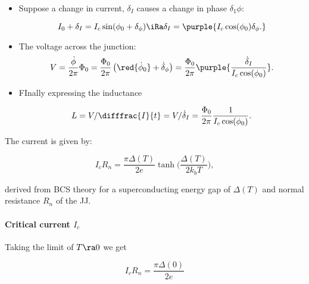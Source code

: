   \begin{itemize}
  	\item Suppose a change in current, $ \delta_I $ causes a change in phase $ \delta_1\phi $:
  	
  	\begin{equation}\label{key}
  		I_0 + \delta_I = I_c\sin(\phi_0+\delta_\phi) \iRa \delta_I = \purple{I_c\cos(\phi_0)\delta_\phi.}
  	\end{equation}
  	\item The voltage across the junction:
  	\begin{equation}\label{key}
  		V = \frac{\dot{\phi}}{2\pi}\Phi_0 = \frac{\Phi_0}{2\pi}\left(\red{\dot{\phi}_0} + \dot{\delta}_\phi\right) =  \frac{\Phi_0}{2\pi}\purple{\frac{\dot{\delta}_I}{I_c\cos(\phi_0)}}.
  	\end{equation}
  	
  	\item FInally expressing the inductance
  	
  	\begin{equation}\label{key}
  		L = V/\difffrac{I}{t} = V/\dot{\delta}_I = \frac{\Phi_0}{2\pi}\frac{1}{I_c\cos(\phi_0)}.
  	\end{equation}
  \end{itemize}
   
   
   \noindent The current is given by:
   
   \begin{equation}\label{key}
   I_cR_n = \frac{\pi\Delta(T)}{2e}\tanh\big(\frac{\Delta(T)}{2k_bT}\big),
   \end{equation}
   
   \noindent derived from BCS theory for a superconducting energy gap of $ \Delta(T) $ and normal resistance $ R_n $ of the JJ. 
   
   {
   	\paragraph{Critical current $ I_c $}
   	Taking the limit of $ T\ra0 $ we get  
   	
   	\begin{equation}\label{app:criticalCurrent}
   	I_cR_n = \frac{\pi\Delta(0)}{2e}
   	\end{equation}
   }
   
